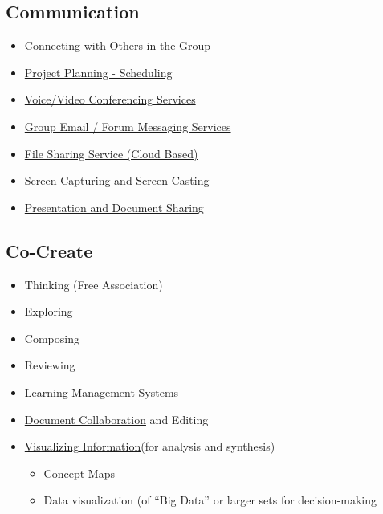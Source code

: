 \subsection{Communication}

\begin{itemize}
\item
  Connecting with Others in the Group
\end{itemize}

\begin{itemize}
\item
  \href{http://peeragogy.org/planning-and-scheduling/}{Project Planning
  - Scheduling}
\item
  \href{http://peeragogy.org/voice-and-video-conferencing/}{Voice/Video
  Conferencing Services}
\item
  \href{http://peeragogy.org/group-communication/}{Group Email / Forum
  Messaging Services}
\item
  \href{http://peeragogy.org/file-sharing/}{File Sharing Service (Cloud
  Based)}
\item
  \href{http://peeragogy.org/screen-capture/}{Screen Capturing and
  Screen Casting}
\item
  \href{http://peeragogy.org/presentation-and-document-sharing/}{Presentation
  and Document Sharing}
\end{itemize}

\subsection{Co-Create}

\begin{itemize}
\item
  Thinking (Free Association)
\item
  Exploring
\item
  Composing
\item
  Reviewing
\end{itemize}

\begin{itemize}
\item
  \href{http://peeragogy.org/learning-management-systems/}{Learning
  Management Systems}
\item
  \href{http://peeragogy.org/document-collaborationediting/}{Document
  Collaboration} and Editing
\item
  \href{http://peeragogy.org/visualization/}{Visualizing
  Information}(for analysis and synthesis)

  \begin{itemize}
  \item
    \href{http://peeragogy.org/concept-maps/}{Concept Maps}
  \item
    Data visualization (of ``Big Data'' or larger sets for
    decision-making
  \end{itemize}
\end{itemize}

